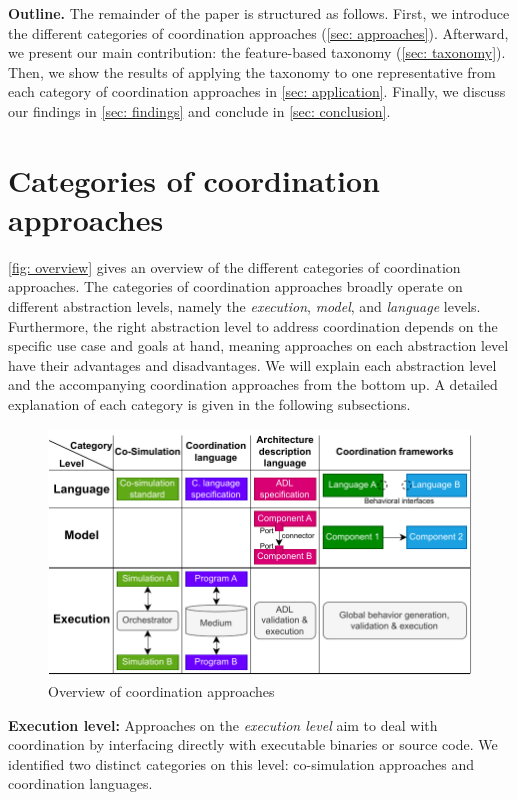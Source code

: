 \documentclass[runningheads]{llncs}
\begin{document}
\textbf{Outline.} The remainder of the paper is structured as follows.
First, we introduce the different categories of coordination approaches (\autoref{sec: approaches}).
Afterward, we present our main contribution: the feature-based taxonomy (\autoref{sec: taxonomy}).
Then, we show the results of applying the taxonomy to one representative from each category of coordination approaches in \autoref{sec: application}.
Finally, we discuss our findings in \autoref{sec: findings} and conclude in \autoref{sec: conclusion}.

\section{Categories of coordination approaches} \label{sec: approaches}

\autoref{fig: overview} gives an overview of the different categories of coordination approaches.
The categories of coordination approaches broadly operate on different abstraction levels, namely the \textit{execution}, \textit{model}, and \textit{language} levels.
Furthermore, the right abstraction level to address coordination depends on the specific use case and goals at hand, meaning approaches on each abstraction level have their advantages and disadvantages.
We will explain each abstraction level and the accompanying coordination approaches from the bottom up.
A detailed explanation of each category is given in the following subsections.

\begin{figure}[ht]
	\centering
	\includegraphics[width=1\textwidth]{images/overview}
	\caption{Overview of coordination approaches}
	\label{fig: overview}
\end{figure}

\textbf{Execution level:} Approaches on the \textit{execution level} aim to deal with coordination by interfacing directly with executable binaries or source code.
We identified two distinct categories on this level: co-simulation approaches and coordination languages.
\end{document}
